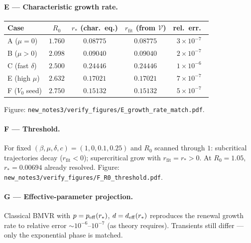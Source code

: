 \documentclass[11pt,a4paper]{article}
\newcommand{\Vfree}{\mathcal{V}}
\theoremstyle{plain}
\theoremstyle{definition}
\theoremstyle{remark}
\begin{document}
\paragraph{E --- Characteristic growth rate.}
\begin{center}
\begin{tabular}{@{}lcccc@{}}
\toprule
Case & $R_0$ & $r_*$ (char.\ eq.) & $r_{\mathrm{fit}}$ (from $\Vfree$) & rel.\ err.\ \\
\midrule
A ($\mu=0$) & $1.760$ & $0.08775$ & $0.08775$ & $3\times 10^{-7}$ \\
B ($\mu>0$) & $2.098$ & $0.09040$ & $0.09040$ & $2\times 10^{-7}$ \\
C (fast $\delta$) & $2.500$ & $0.24446$ & $0.24446$ & $1\times 10^{-6}$ \\
E (high $\mu$) & $2.632$ & $0.17021$ & $0.17021$ & $7\times 10^{-7}$ \\
F ($V_0$ seed) & $2.750$ & $0.15132$ & $0.15132$ & $5\times 10^{-7}$ \\
\bottomrule
\end{tabular}
\end{center}
Figure: \texttt{new\_notes3/verify\_figures/E\_growth\_rate\_match.pdf}.

\paragraph{F --- Threshold.}
For fixed $(\beta,\mu,\delta,c)=(1,0,0.1,0.25)$ and $R_0$ scanned through $1$:
subcritical trajectories decay ($r_{\mathrm{fit}}<0$); supercritical grow with
$r_{\mathrm{fit}}=r_*>0$. At $R_0=1.05$, $r_*=0.00694$ already resolved.
Figure: \texttt{new\_notes3/verify\_figures/F\_R0\_threshold.pdf}.

\paragraph{G --- Effective-parameter projection.}
Classical BMVR with $p=p_{\rm eff}(r_*)$, $d=d_{\rm eff}(r_*)$ reproduces the
renewal growth rate to relative error $\sim 10^{-6}$--$10^{-7}$ (as theory
requires). Transients still differ --- only the exponential phase is matched.
\end{document}
